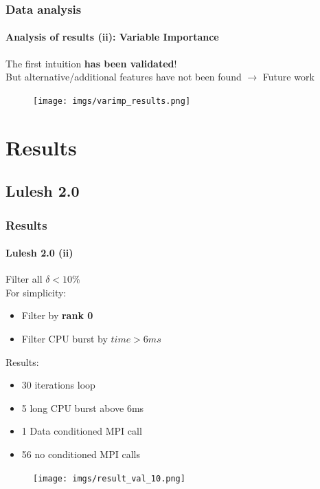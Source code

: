 \documentclass{beamer}
\begin{document}
\begin{frame}
\frametitle{Data analysis}
\framesubtitle{Analysis of results (ii): \textbf{Variable Importance}}
The first intuition \textbf{has been validated}!\\
But alternative/additional features have not been found $\rightarrow$ Future work
\begin{figure}
	\texttt{[image: imgs/varimp\_results.png]}
\end{figure}
\end{frame}

\section{Results}
\subsection{Lulesh 2.0}
\begin{frame}
\frametitle{Results}
\framesubtitle{Lulesh 2.0 (ii)}
\begin{multicols*}{2}
Filter all $\delta < 10\%$\\
For simplicity:
\begin{itemize}
	\item Filter by \textbf{rank 0}
	\item Filter CPU burst by $time > 6ms$
\end{itemize}
\pause
Results:
\begin{itemize}
	\item 30 iterations loop
	\item 5 long CPU burst above 6ms
	\item 1 Data conditioned MPI call
	\item 56 no conditioned MPI calls
\end{itemize}
\columnbreak
\begin{figure}
	\texttt{[image: imgs/result\_val\_10.png]}
\end{figure}
\end{multicols*}
\end{frame}

\end{document}
